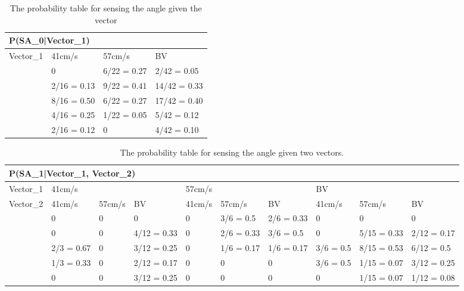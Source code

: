\begin{center}
\begin{table}[H]
\begin{tabular}{|l|l|l|l|}
\hline
\multicolumn{4}{|l|}{P(SA\_0|Vector\_1)} \\ \hline
Vector\_1     & 41cm/s & 57cm/s & BV \\\hline
[-30 - 0]   & 0           & 6/22 = 0.27  & 2/42 = 0.05  \\ \hline
[0 - 30]    & 2/16 = 0.13 & 9/22 = 0.41  & 14/42 = 0.33 \\ \hline
[30 - 60]   & 8/16 = 0.50 & 6/22 = 0.27  & 17/42 = 0.40 \\ \hline
[60 - 90]   & 4/16 = 0.25 & 1/22 = 0.05  & 5/42 = 0.12  \\ \hline
[90- 330]   & 2/16 = 0.12 & 0            & 4/42 = 0.10   \\ \hline
\end{tabular}
\label{SAtable}
\caption{The probability table for sensing the angle given the vector}
\end{table}
\end{center}

\begin{table}[H]
\centering
\begin{tabular}{|l|p{1.2cm}|p{1.2cm}|p{1.2cm}|p{1.2cm}|p{1.2cm}|p{1.2cm}|p{1.2cm}|p{1.2cm}|p{1.2cm}|}
\hline
\multicolumn{10}{|l|}{P(SA\_1|Vector\_1, Vector\_2)} \\\hline
Vector\_1 & \multicolumn{3}{l|}{41cm/s} & \multicolumn{3}{l|}{57cm/s} &
\multicolumn{3}{l|}{BV}\\\hline
Vector\_2 & 41cm/s & 57cm/s & BV & 41cm/s & 57cm/s & BV & 41cm/s & 57cm/s & BV
\\\hline
[-30 - 0] & 0  & 0 & 0 & 0 & 3/6 = 0.5 & 2/6 = 0.33 &
0 & 0 & 0 \\ \hline
[0 - 30] & 0 & 0 & 4/12 = 0.33 & 0 & 2/6 = 0.33 & 3/6 = 0.5 & 0 & 5/15 =
0.33 & 2/12 = 0.17 \\ \hline 
[30 - 60] & 2/3 = 0.67 & 0 & 3/12 = 0.25 & 0 & 1/6 = 0.17 & 1/6 = 0.17
& 3/6 = 0.5 & 8/15 = 0.53 & 6/12 = 0.5 \\ \hline 
[60 - 90] & 1/3 = 0.33 & 0 & 2/12 = 0.17 & 0 & 0 & 0 & 3/6 = 0.5 & 1/15 = 0.07 &
3/12 = 0.25 \\ \hline 
[90 - 330] & 0 & 0 & 3/12 = 0.25 & 0 & 0 & 0 & 0 & 1/15 = 0.07 & 1/12 = 0.08\\
\hline
\end{tabular}
\caption{The probability table for sensing the angle given two vectors.}
\label{SDtable2}
\end{table}

